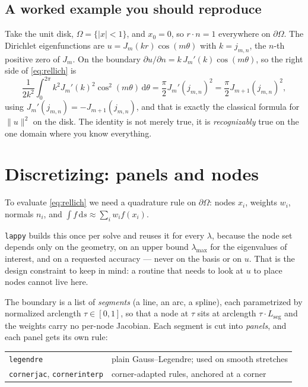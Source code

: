 \documentclass[11pt]{article}
\theoremstyle{definition}
\theoremstyle{remark}
\newcommand{\dd}{\,\mathrm{d}}
\newcommand{\Om}{\Omega}
\newcommand{\code}[1]{\texttt{#1}}
\begin{document}
\subsection{A worked example you should reproduce}

Take the unit disk, $\Om=\{|x|<1\}$, and $x_0=0$, so $r\cdot n=1$ everywhere on
$\partial\Om$. The Dirichlet eigenfunctions are
$u=J_m(kr)\cos(m\theta)$ with $k=j_{m,n}$, the $n$-th positive zero of $J_m$.
On the boundary $\partial u/\partial n = k\,J_m'(k)\cos(m\theta)$, so the right
side of \eqref{eq:rellich} is
\begin{equation}
  \frac{1}{2k^2}\int_0^{2\pi} k^2 J_m'(k)^2\cos^2(m\theta)\dd\theta
  = \frac{\pi}{2}J_m'(j_{m,n})^2
  = \frac{\pi}{2}J_{m+1}(j_{m,n})^2 ,
\end{equation}
using $J_m'(j_{m,n})=-J_{m+1}(j_{m,n})$, and that is exactly the classical
formula for $\|u\|^2$ on the disk. The identity is not merely true, it is
\emph{recognizably} true on the one domain where you know everything.

\section{Discretizing: panels and nodes}

To evaluate \eqref{eq:rellich} we need a quadrature rule on $\partial\Om$: nodes
$x_i$, weights $w_i$, normals $n_i$, and
$\int f \dd s \approx \sum_i w_i f(x_i)$.

\code{lappy} builds this once per solve and reuses it for every $\lambda$,
because the node set depends only on the geometry, on an upper bound
$\lambda_{\max}$ for the eigenvalues of interest, and on a requested accuracy ---
never on the basis or on $u$. That is the design constraint to keep in mind: a
routine that needs to look at $u$ to place nodes cannot live here.

The boundary is a list of \emph{segments} (a line, an arc, a spline), each
parametrized by normalized arclength $\tau\in[0,1]$, so that a node at $\tau$
sits at arclength $\tau\cdot L_{\text{seg}}$ and the weights carry no per-node
Jacobian. Each segment is cut into \emph{panels}, and each panel gets its own
rule:

\begin{center}
\begin{tabular}{ll}
\toprule
\code{legendre} & plain Gauss--Legendre; used on smooth stretches \\
\code{cornerjac}, \code{cornerinterp} & corner-adapted rules, anchored at a corner\\
\bottomrule
\end{tabular}
\end{center}
\end{document}
